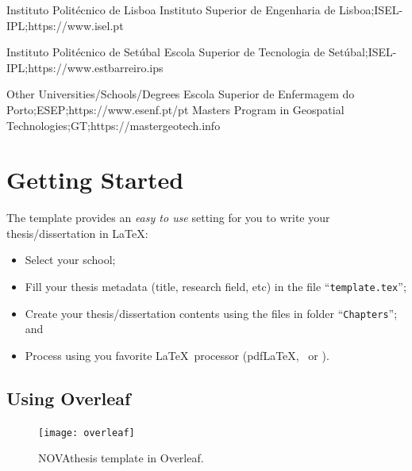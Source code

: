 \begin{ntUniversity}{Instituto Politécnico de Lisboa}
             {{Instituto Superior de Engenharia de Lisboa};{ISEL-IPL};{https://www.isel.pt}}
\end{ntUniversity}

\begin{ntUniversity}{Instituto Politécnico de Setúbal}
             {{Escola Superior de Tecnologia de Setúbal};{ISEL-IPL};{https://www.estbarreiro.ips}}%
\end{ntUniversity}

\begin{ntUniversity}{Other Universities/Schools/Degrees}
             {{Escola Superior de Enfermagem do Porto};{ESEP};{https://www.esenf.pt/pt}}%
             {{Masters Program in Geospatial Technologies};{GT};{https://mastergeotech.info}}%
\end{ntUniversity}


\section{Getting Started}
\label{sec:getting_started}

The template provides an \emph{easy to use} setting for you to write your thesis/dissertation in \LaTeX:
\begin{itemize}
  \item  Select your school;
  \item Fill your thesis metadata (title, research field, etc) in the file “\texttt{template.tex}”;
  \item Create your thesis/dissertation contents using the files in folder “\texttt{Chapters}”; and
  \item Process using you favorite \LaTeX\ processor (pdf\LaTeX, \XeLaTeX\ or \LuaLaTeX).
\end{itemize}

\subsection{Using Overleaf}
\label{sub:using_overleaf}

\begin{figure}
\vspace*{-10ex}\texttt{[image: overleaf]}%
\caption{NOVAthesis template in Overleaf.}
\end{figure}

